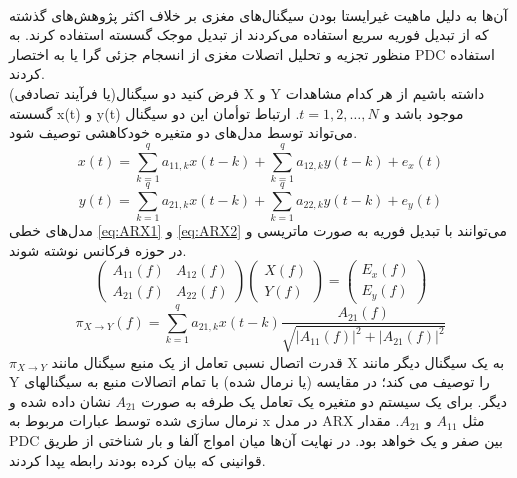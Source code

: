 \\
آن‌ها به دلیل ماهیت غیرایستا بودن سیگنال‌های مغزی بر خلاف اکثر پژوهش‌های گذشته که از تبدیل فوریه سریع استفاده می‌کردند از تبدیل موجک گسسته استفاده کرند. به منظور تجزیه و تحلیل اتصلات مغزی از انسجام جزئی گرا یا به اختصار PDC استفاده کردند.
\\
فرض کنید دو سیگنال(یا فرآیند تصادفی) X و Y داشته باشیم از هر کدام مشاهدات گسسته x(t) و y(t) موجود باشد و $ t = 1,2, \dots, N $. ارتباط توأمان این دو سیگنال می‌تواند توسط مدل‌های دو متغیره خودکاهشی 
توصیف شود.
\begin{equation}
\label{eq:ARX1}
x(t)=\sum_{k=1}^{q} a_{11, k} x(t-k)+\sum_{k=1}^{q} a_{12, k} y(t-k)+e_{x}(t)
\end{equation}
\begin{equation}
\label{eq:ARX2}
y(t)=\sum_{k=1}^{q} a_{21, k} x(t-k)+\sum_{k=1}^{q} a_{22, k} y(t-k)+e_{y}(t)
\end{equation}
مدل‌های خطی 
\eqref{eq:ARX1}
و
\eqref{eq:ARX2}
می‌توانند با تبدیل فوریه به صورت ماتریسی و در حوزه فرکانس نوشته شوند.
\begin{equation}
\label{eq:PDC1}
\left(\begin{array}{ll}
A_{11}(f) & A_{12}(f) \\
A_{21}(f) & A_{22}(f)
\end{array}\right)\left(\begin{array}{l}
X(f) \\
Y(f)
\end{array}\right)=\left(\begin{array}{l}
E_{x}(f) \\
E_{y}(f)
\end{array}\right)
\end{equation}
\begin{equation}
\label{eq:PDC2}
\pi_{X \rightarrow Y}(f)=\sum_{k=1}^{q} a_{21, k} x(t-k) \frac{A_{21}(f)}{\sqrt{\left|A_{11}(f)\right|^{2}+\left|A_{21}(f)\right|^{2}}}
\end{equation}
$ \pi_{X \rightarrow Y} $
قدرت اتصال نسبی تعامل از یک منبع سیگنال مانند X به یک سیگنال دیگر مانند Y را توصیف می کند؛ در مقایسه (یا نرمال شده) با تمام اتصالات منبع به سیگنالهای دیگر. برای یک سیستم دو متغیره یک تعامل یک طرفه به صورت $ A_{21} $ نشان داده شده و نرمال سازی شده توسط عبارات مربوط به x در مدل ARX مثل $ A_{11} $ و $ A_{21} $. مقدار PDC بین صفر و یک خواهد بود. در نهایت آن‌ها میان امواج آلفا و بار شناختی از طریق قوانینی که بیان کرده بودند رابطه یپدا کردند.

